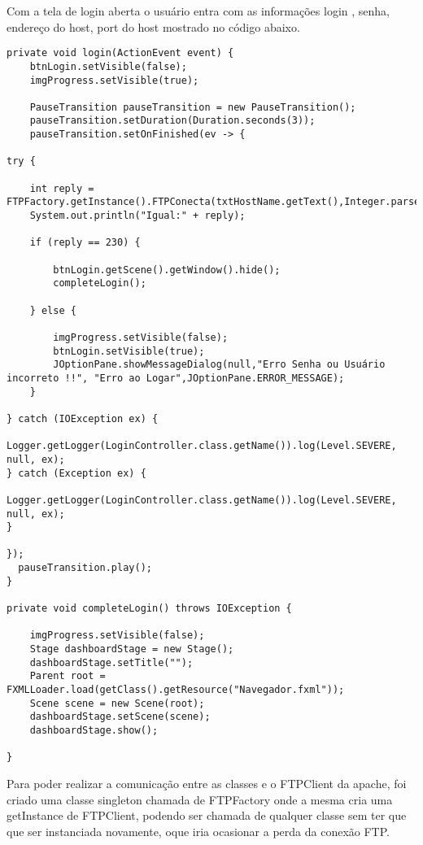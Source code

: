 \documentclass[12pt]{article}
\begin{document}
Com a tela de login aberta o usuário entra com as informações login , senha, endereço do host, port do host mostrado no código abaixo.
\vspace{.4cm}
\begin{lstlisting}
private void login(ActionEvent event) {
	btnLogin.setVisible(false);
	imgProgress.setVisible(true);
	
	PauseTransition pauseTransition = new PauseTransition();
	pauseTransition.setDuration(Duration.seconds(3));
	pauseTransition.setOnFinished(ev -> {

try {
	
	int reply = FTPFactory.getInstance().FTPConecta(txtHostName.getText(),Integer.parseInt(txtHostPort.getText()),this.txtUsername.getText(),this.txtPassword.getText());
	System.out.println("Igual:" + reply);
	
	if (reply == 230) {
	
		btnLogin.getScene().getWindow().hide();
		completeLogin();
	
	} else {
	
		imgProgress.setVisible(false);
		btnLogin.setVisible(true);
		JOptionPane.showMessageDialog(null,"Erro Senha ou Usuário incorreto !!", "Erro ao Logar",JOptionPane.ERROR_MESSAGE);
	}

} catch (IOException ex) {
	Logger.getLogger(LoginController.class.getName()).log(Level.SEVERE, null, ex);
} catch (Exception ex) {
	Logger.getLogger(LoginController.class.getName()).log(Level.SEVERE, null, ex);
}

});
  pauseTransition.play();
}

private void completeLogin() throws IOException {
	
	imgProgress.setVisible(false);
	Stage dashboardStage = new Stage();
	dashboardStage.setTitle("");
	Parent root = FXMLLoader.load(getClass().getResource("Navegador.fxml"));
	Scene scene = new Scene(root);
	dashboardStage.setScene(scene);
	dashboardStage.show();
	
}

\end{lstlisting}


Para poder realizar a comunicação entre as classes e o FTPClient da apache, foi criado uma classe singleton chamada de FTPFactory onde a mesma cria uma getInstance de FTPClient, podendo ser chamada de qualquer classe sem ter que que ser instanciada novamente, oque iria ocasionar a perda da conexão FTP.
\end{document}
